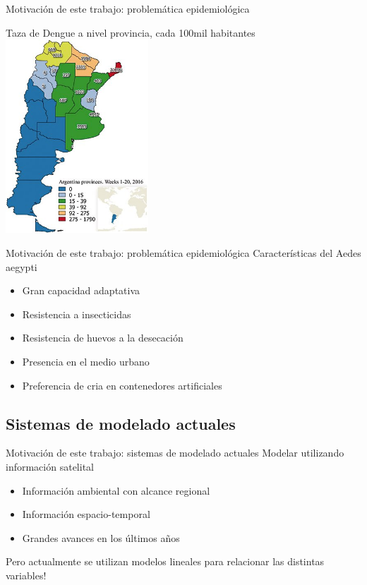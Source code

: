 \documentclass[10pt]{beamer}
\begin{document}
\begin{frame}{Motivación de este trabajo: problemática epidemiológica}

  \begin{center}
    Taza de Dengue a nivel provincia, cada 100mil habitantes
    \includegraphics[width=0.4\textwidth]{dengue}
  \end{center}

\end{frame}



\begin{frame}{Motivación de este trabajo: problemática epidemiológica}
  Características del Aedes aegypti
  \pause
  \begin{itemize}[<+->]
   \item Gran capacidad adaptativa
   \item Resistencia a insecticidas
   \item Resistencia de huevos a la desecación
   \item Presencia en el medio urbano
   \item Preferencia de cria en contenedores artificiales
  \end{itemize}
\end{frame}



\subsection{Sistemas de modelado actuales}


\begin{frame}{Motivación de este trabajo: sistemas de modelado actuales}
  Modelar utilizando información satelital
  \pause
  \begin{itemize}[<+->]
   \item Información ambiental con alcance regional
   \item Información espacio-temporal
   \item Grandes avances en los últimos años
   \pause

  \end{itemize}
  \begin{center}
    Pero actualmente se utilizan modelos lineales para relacionar las distintas
    variables!
  \end{center}

\end{frame}
\end{document}
